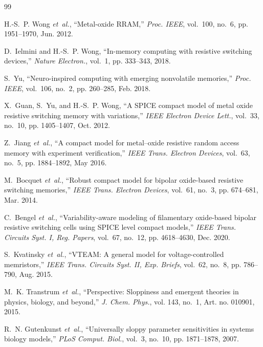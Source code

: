 \documentclass[journal]{IEEEtran}
\begin{document}
\begin{thebibliography}{99}\footnotesize

H.-S.~P. Wong \emph{et~al.}, ``Metal-oxide RRAM,'' \emph{Proc. IEEE},
vol.~100, no.~6, pp. 1951--1970, Jun. 2012.

D.~Ielmini and H.-S.~P. Wong, ``In-memory computing with resistive switching
devices,'' \emph{Nature Electron.}, vol.~1, pp. 333--343, 2018.

S.~Yu, ``Neuro-inspired computing with emerging nonvolatile memories,''
\emph{Proc. IEEE}, vol.~106, no.~2, pp. 260--285, Feb. 2018.

X.~Guan, S.~Yu, and H.-S.~P. Wong, ``A SPICE compact model of metal oxide
resistive switching memory with variations,'' \emph{IEEE Electron Device
Lett.}, vol.~33, no.~10, pp. 1405--1407, Oct. 2012.

Z.~Jiang \emph{et~al.}, ``A compact model for metal--oxide resistive random
access memory with experiment verification,'' \emph{IEEE Trans. Electron
Devices}, vol.~63, no.~5, pp. 1884--1892, May 2016.

M.~Bocquet \emph{et~al.}, ``Robust compact model for bipolar oxide-based
resistive switching memories,'' \emph{IEEE Trans. Electron Devices}, vol.~61,
no.~3, pp. 674--681, Mar. 2014.

C.~Bengel \emph{et~al.}, ``Variability-aware modeling of filamentary
oxide-based bipolar resistive switching cells using SPICE level compact
models,'' \emph{IEEE Trans. Circuits Syst. I, Reg. Papers}, vol.~67, no.~12,
pp. 4618--4630, Dec. 2020.

S.~Kvatinsky \emph{et~al.}, ``VTEAM: A general model for voltage-controlled
memristors,'' \emph{IEEE Trans. Circuits Syst. II, Exp. Briefs}, vol.~62,
no.~8, pp. 786--790, Aug. 2015.

M.~K. Transtrum \emph{et~al.}, ``Perspective: Sloppiness and emergent theories
in physics, biology, and beyond,'' \emph{J. Chem. Phys.}, vol. 143, no.~1,
Art. no. 010901, 2015.

R.~N. Gutenkunst \emph{et~al.}, ``Universally sloppy parameter sensitivities in
systems biology models,'' \emph{PLoS Comput. Biol.}, vol.~3, no.~10,
pp. 1871--1878, 2007.


\end{thebibliography}
\end{document}
